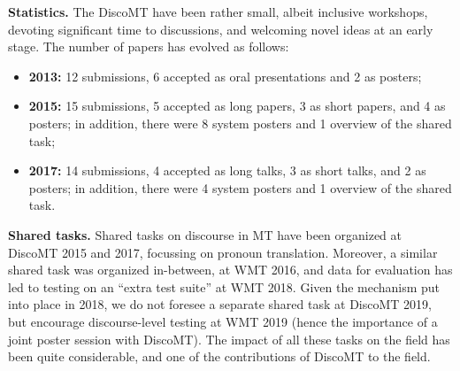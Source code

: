\documentclass[11pt]{article}
\begin{document}
\textbf{Statistics.}  The DiscoMT have been rather small, albeit inclusive workshops, devoting significant time to discussions, and welcoming novel ideas at an early stage.  The number of papers has evolved as follows:
\begin{itemize}
    \item \textbf{2013:} 12 submissions, 6 accepted as oral presentations and 2 as posters;
    \item \textbf{2015:} 15 submissions, 5 accepted as long papers, 3 as short papers, and 4 as posters; in addition, there were 8 system posters and 1 overview of the shared task;
    \item \textbf{2017:} 14 submissions, 4 accepted as long talks, 3 as short talks, and 2 as posters; in addition, there were 4 system posters and 1 overview of the shared task.
\end{itemize}


\textbf{Shared tasks.}  Shared tasks on discourse in MT have been organized at DiscoMT 2015 and 2017, focussing on pronoun translation.  Moreover, a similar shared task was organized in-between, at WMT 2016, and data for evaluation has led to testing on an ``extra test suite'' at WMT 2018.  Given the mechanism put into place in 2018, we do not foresee a separate shared task at DiscoMT 2019, but encourage discourse-level testing at WMT 2019 (hence the importance of a joint poster session with DiscoMT).  The impact of all these tasks on the field has been quite considerable, and one of the contributions of DiscoMT to the field.
\end{document}
